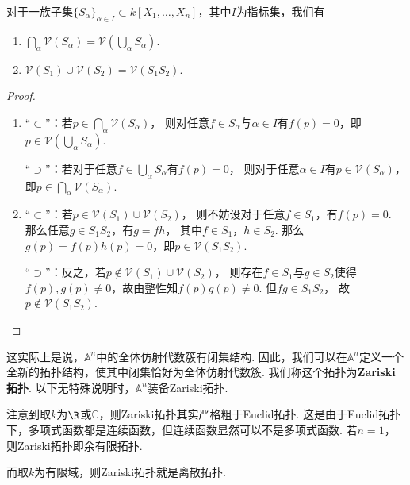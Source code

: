     \begin{proposition}
        对于一族子集$\{S_{\alpha}\}_{\alpha \in I} \subset k[X_{1},\ldots,X_{n}]$，其中$I$为指标集，我们有
        \begin{enumerate}
            \item[(1)] $\bigcap_{\alpha} \mathcal{V}(S_{\alpha}) = \mathcal{V}(\bigcup_{\alpha}S_{\alpha})$.
            \item[(2)] $\mathcal{V}(S_{1}) \cup \mathcal{V}(S_{2}) = \mathcal{V}(S_{1}S_{2})$.
        \end{enumerate}
    \end{proposition}
    \begin{proof}
        \begin{enumerate}
            \item[(1)] ``$\subset$''：若$p \in \bigcap_{\alpha} \mathcal{V}(S_{\alpha})$，
                        则对任意$f \in S_{\alpha}$与$\alpha \in I$有$f(p)=0$，即
                        $p \in \mathcal{V}(\bigcup_{\alpha}S_{\alpha})$. \par
                       ``$\supset$''：若对于任意$f \in \bigcup_{\alpha}S_{\alpha}$有$f(p)=0$，
                        则对于任意$\alpha \in I$有$p \in \mathcal{V}(S_{\alpha})$，
                        即$p \in \bigcap_{\alpha} \mathcal{V}(S_{\alpha})$.
            \item[(2)] ``$\subset$''：若$p \in \mathcal{V}(S_{1}) \cup \mathcal{V}(S_{2})$，
                        则不妨设对于任意$f \in S_{1}$，有$f(p)=0$. 
                        那么任意$g \in S_{1}S_{2}$，有$g=fh$，
                        其中$f \in S_{1}$，$h \in S_{2}$. 
                        那么$g(p) = f(p)h(p) = 0$，即$p \in \mathcal{V}(S_{1}S_{2})$. \par
                       ``$\supset$''：反之，若$p \notin \mathcal{V}(S_{1})\cup\mathcal{V}(S_{2})$，
                        则存在$f \in S_{1}$与$g \in S_{2}$使得
                        $f(p),g(p) \neq 0$，故由整性知$f(p)g(p) \neq 0$. 但$fg \in S_{1}S_{2}$，
                        故$p \notin \mathcal{V}(S_{1}S_{2})$.\qedhere
        \end{enumerate}
    \end{proof}

    这实际上是说，$\mathbb{A}^{n}$中的全体仿射代数簇有闭集结构. 
    因此，我们可以在$\mathbb{A}^{n}$定义一个全新的拓扑结构，使其中闭集恰好为全体仿射代数簇.
    我们称这个拓扑为\textbf{Zariski拓扑}. 以下无特殊说明时，$\mathbb{A}^{n}$装备Zariski拓扑.

    \begin{remark}
        注意到取$k$为$\R$或$\mathbb{C}$，则Zariski拓扑其实严格粗于Euclid拓扑. 
        这是由于Euclid拓扑下，多项式函数都是连续函数，但连续函数显然可以不是多项式函数. 
        若$n=1$，则Zariski拓扑即余有限拓扑.

        而取$k$为有限域，则Zariski拓扑就是离散拓扑.
    \end{remark}


